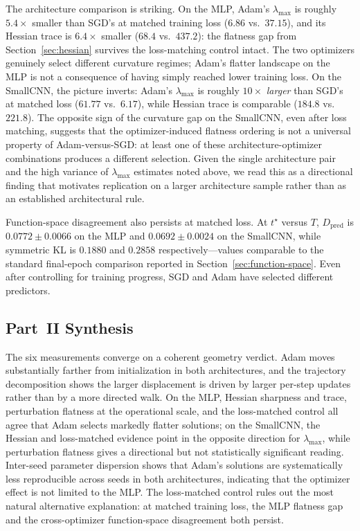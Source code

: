 \documentclass[11pt]{article}
\begin{document}
The architecture comparison is striking. On the MLP, Adam's $\lambda_{\max}$ is roughly $5.4\times$ smaller than SGD's at matched training loss ($6.86$ vs.\ $37.15$), and its Hessian trace is $6.4\times$ smaller ($68.4$ vs.\ $437.2$): the flatness gap from Section~\ref{sec:hessian} survives the loss-matching control intact. The two optimizers genuinely select different curvature regimes; Adam's flatter landscape on the MLP is not a consequence of having simply reached lower training loss. On the SmallCNN, the picture inverts: Adam's $\lambda_{\max}$ is roughly $10\times$ \emph{larger} than SGD's at matched loss ($61.77$ vs.\ $6.17$), while Hessian trace is comparable ($184.8$ vs.\ $221.8$). The opposite sign of the curvature gap on the SmallCNN, even after loss matching, suggests that the optimizer-induced flatness ordering is not a universal property of Adam-versus-SGD: at least one of these architecture-optimizer combinations produces a different selection. Given the single architecture pair and the high variance of $\lambda_{\max}$ estimates noted above, we read this as a directional finding that motivates replication on a larger architecture sample rather than as an established architectural rule.

Function-space disagreement also persists at matched loss. At $t^\star$ versus $T$, $D_{\mathrm{pred}}$ is $0.0772 \pm 0.0066$ on the MLP and $0.0692 \pm 0.0024$ on the SmallCNN, while symmetric KL is $0.1880$ and $0.2858$ respectively---values comparable to the standard final-epoch comparison reported in Section~\ref{sec:function-space}. Even after controlling for training progress, SGD and Adam have selected different predictors.

\FloatBarrier

\subsection{Part~II Synthesis}
\label{sec:part2-synthesis}

The six measurements converge on a coherent geometry verdict. Adam moves substantially farther from initialization in both architectures, and the trajectory decomposition shows the larger displacement is driven by larger per-step updates rather than by a more directed walk. On the MLP, Hessian sharpness and trace, perturbation flatness at the operational scale, and the loss-matched control all agree that Adam selects markedly flatter solutions; on the SmallCNN, the Hessian and loss-matched evidence point in the opposite direction for $\lambda_{\max}$, while perturbation flatness gives a directional but not statistically significant reading. Inter-seed parameter dispersion shows that Adam's solutions are systematically less reproducible across seeds in both architectures, indicating that the optimizer effect is not limited to the MLP. The loss-matched control rules out the most natural alternative explanation: at matched training loss, the MLP flatness gap and the cross-optimizer function-space disagreement both persist.
\end{document}
